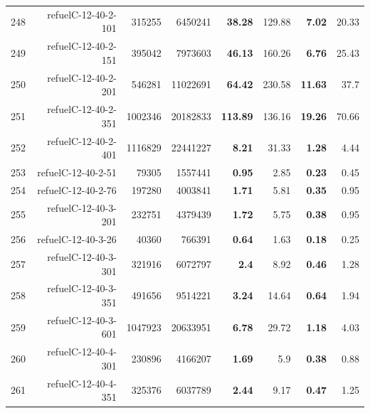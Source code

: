 \begin{longtable}{lrr@{\hskip 12pt}r@{\hskip 12pt}r@{\hskip 12pt}r@{\hskip 12pt}r@{\hskip 12pt}r}
248 & \multirow{1}{*}{refuelC-12-40-2-101} & \multirow{1}{*}{315255} & \multirow{1}{*}{6450241} & \textbf{38.28} & 129.88 & \textbf{7.02} & 20.33 \\
249 & \multirow{1}{*}{refuelC-12-40-2-151} & \multirow{1}{*}{395042} & \multirow{1}{*}{7973603} & \textbf{46.13} & 160.26 & \textbf{6.76} & 25.43 \\
250 & \multirow{1}{*}{refuelC-12-40-2-201} & \multirow{1}{*}{546281} & \multirow{1}{*}{11022691} & \textbf{64.42} & 230.58 & \textbf{11.63} & 37.7 \\
251 & \multirow{1}{*}{refuelC-12-40-2-351} & \multirow{1}{*}{1002346} & \multirow{1}{*}{20182833} & \textbf{113.89} & 136.16 & \textbf{19.26} & 70.66 \\
252 & \multirow{1}{*}{refuelC-12-40-2-401} & \multirow{1}{*}{1116829} & \multirow{1}{*}{22441227} & \textbf{8.21} & 31.33 & \textbf{1.28} & 4.44 \\
253 & \multirow{1}{*}{refuelC-12-40-2-51} & \multirow{1}{*}{79305} & \multirow{1}{*}{1557441} & \textbf{0.95} & 2.85 & \textbf{0.23} & 0.45 \\
254 & \multirow{1}{*}{refuelC-12-40-2-76} & \multirow{1}{*}{197280} & \multirow{1}{*}{4003841} & \textbf{1.71} & 5.81 & \textbf{0.35} & 0.95 \\
255 & \multirow{1}{*}{refuelC-12-40-3-201} & \multirow{1}{*}{232751} & \multirow{1}{*}{4379439} & \textbf{1.72} & 5.75 & \textbf{0.38} & 0.95 \\
256 & \multirow{1}{*}{refuelC-12-40-3-26} & \multirow{1}{*}{40360} & \multirow{1}{*}{766391} & \textbf{0.64} & 1.63 & \textbf{0.18} & 0.25 \\
257 & \multirow{1}{*}{refuelC-12-40-3-301} & \multirow{1}{*}{321916} & \multirow{1}{*}{6072797} & \textbf{2.4} & 8.92 & \textbf{0.46} & 1.28 \\
258 & \multirow{1}{*}{refuelC-12-40-3-351} & \multirow{1}{*}{491656} & \multirow{1}{*}{9514221} & \textbf{3.24} & 14.64 & \textbf{0.64} & 1.94 \\
259 & \multirow{1}{*}{refuelC-12-40-3-601} & \multirow{1}{*}{1047923} & \multirow{1}{*}{20633951} & \textbf{6.78} & 29.72 & \textbf{1.18} & 4.03 \\
260 & \multirow{1}{*}{refuelC-12-40-4-301} & \multirow{1}{*}{230896} & \multirow{1}{*}{4166207} & \textbf{1.69} & 5.9 & \textbf{0.38} & 0.88 \\
261 & \multirow{1}{*}{refuelC-12-40-4-351} & \multirow{1}{*}{325376} & \multirow{1}{*}{6037789} & \textbf{2.44} & 9.17 & \textbf{0.47} & 1.25 \\

\end{longtable}
